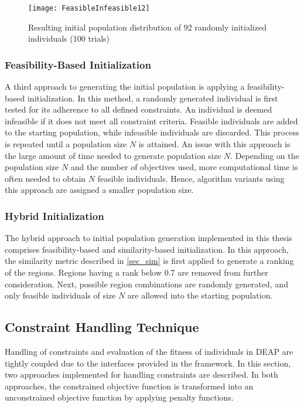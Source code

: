 \begin{figure}[t]
    \centering
    \texttt{[image: FeasibleInfeasible12]}
    \caption{Resulting initial population distribution of 92 randomly initialized individuals (100 trials)}
    \label{fig:feasibleinfeasiblecomp}
\end{figure}

\subsubsection{Feasibility-Based Initialization}\label{sec_feas}
A third approach to generating the initial population is applying a feasibility-based initialization. In this method, a randomly generated individual is first tested for its adherence to all defined constraints. An individual is deemed infeasible if it does not meet all constraint criteria. Feasible individuals are added to the starting population, while infeasible individuals are discarded. This process is repeated until a population size $N$ is attained. An issue with this approach is the large amount of time needed to generate population size $N$. Depending on the population size $N$ and the number of objectives used, more computational time is often needed to obtain $N$ feasible individuals. Hence, algorithm variants using this approach are assigned a smaller population size.


\subsubsection{Hybrid Initialization}
The hybrid approach to initial population generation implemented in this thesis comprises feasibility-based and similarity-based initialization. In this approach, the similarity metric described in \ref{sec_sim} is first applied to generate a ranking of the regions. Regions having a rank below 0.7 are removed from further consideration. Next, possible region combinations are randomly generated, and only feasible individuals of size $N$ are allowed into the starting population.


\subsection{Constraint Handling Technique}
Handling of constraints and evaluation of the fitness of individuals in \gls{DEAP} are tightly coupled due to the interfaces provided in the framework. In this section, two approaches implemented for handling constraints are described. In both approaches, the constrained objective function is transformed into an unconstrained objective function by applying penalty functions.

